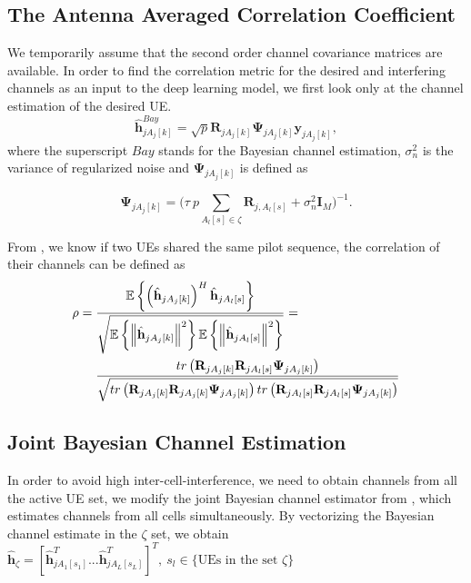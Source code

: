 \subsection{The Antenna Averaged Correlation Coefficient}
We temporarily assume that the second order channel covariance matrices are available. 
In order to find the correlation metric for the desired and interfering channels as an input to the deep learning model, we first look only at the channel estimation of the desired UE.
\begin{equation}
\hat{\mathbf{h}}^{Bay}_{jA_j[k]} = \sqrt{p}\mathbf{R}_{jA_j[k]} \mathbf{\Psi}_{jA_j[k]} \mathbf{y}_{jA_j[k]}, 
\end{equation}
where the superscript $Bay$ stands for the Bayesian channel estimation, $\sigma_{n}^{2}$ is the variance of regularized noise and $\mathbf{\Psi}_{jA_j[k]}$ is defined as

\begin{equation}
\mathbf{\Psi}_{jA_j[k]} = \Bigg(\tau\:{p}\sum_{A_l[s]\in\zeta} \mathbf{R}_{j,A_l[s]} + \sigma^2_n \mathbf{I}_M\Bigg)^{-1}.
\label{eq:psi_function}
\end{equation}

From \cite{bjornson2017massive}, we know if two UEs shared the same pilot sequence, the correlation of their channels can be defined as
\begin{equation}
\begin{split}
\rho={} &
\frac{\operatorname{\mathbb{E}}\left\{ \left(\hat{\mathbf{h}}_{jA_{j}[k]}\right)^{H}\hat{\mathbf{h}}_{jA_{l}[s]}\right\} }{\sqrt{\operatorname{\mathbb{E}}\left\{ \left\Vert \hat{\mathbf{h}}_{jA_{j}[k]}\right\Vert ^{2}\right\} \operatorname{\mathbb{E}}\left\{ \left\Vert \hat{\mathbf{h}}_{jA_{l}[s]}\right\Vert ^{2}\right\} }}=\\
& \frac{tr\left(\mathbf{R}_{jA_{j}[k]}\mathbf{R}_{jA_{l}[s]}\mathbf{\Psi}_{jA_{j}[k]}\right)}{\sqrt{tr\left(\mathbf{R}_{jA_{j}[k]}\mathbf{R}_{jA_{j}[k]}\mathbf{\Psi}_{jA_{j}[k]}\right)tr\left(\mathbf{R}_{jA_{l}[s]}\mathbf{R}_{jA_{l}[s]}\mathbf{\Psi}_{jA_{j}[k]}\right)}}
\end{split}
\end{equation}

\subsection{Joint Bayesian Channel Estimation}
In order to avoid high inter-cell-interference, we need to obtain channels from all the active UE set, we modify the joint Bayesian channel estimator from \cite{yin2013coordinated}, which estimates channels from all cells simultaneously. By vectorizing the Bayesian channel estimate in the $\zeta$ set, we obtain $\hat{\mathbf{h}}_{\zeta}=[\hat{\mathbf{h}}_{jA_{1}[s_{1}]}^{T}...\hat{\mathbf{h}}_{jA_{L}[s_{L}]}^{T}]^{T},\:s_{l}\in \{\text{UEs in the set } \zeta\}$ 

